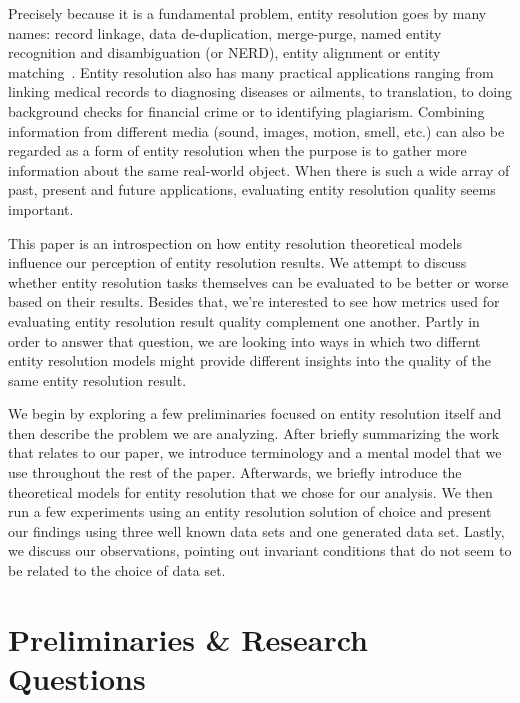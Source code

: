 \documentclass[journal]{IEEEtran}
\begin{document}
    Precisely because it is a fundamental problem, entity resolution goes by
    many names: record linkage, data de-duplication, merge-purge, named entity
    recognition and disambiguation (or NERD), entity alignment or entity
    matching~\cite{Tal11,fever2009,alhelbawy2014}.
    Entity resolution also has many practical applications ranging from linking
    medical records to diagnosing diseases or ailments, to translation, to doing
    background checks for financial crime or to identifying plagiarism.
    Combining information from different media (sound, images, motion, smell,
    etc.) can also be regarded as a form of entity resolution when the purpose
    is to gather more information about the same real-world object.
    When there is such a wide array of past, present and future applications,
    evaluating entity resolution quality seems important.

    This paper is an introspection on how entity resolution theoretical models
    influence our perception of entity resolution results.
    We attempt to discuss whether entity resolution tasks themselves can be
    evaluated to be better or worse based on their results.
    Besides that, we're interested to see how metrics used for evaluating entity
    resolution result quality complement one another.
    Partly in order to answer that question, we are looking into ways in which
    two differnt entity resolution models might provide different insights into
    the quality of the same entity resolution result.
    
    We begin by exploring a few preliminaries focused on entity resolution
    itself and then describe the problem we are analyzing.
    After briefly summarizing the work that relates to our paper, we introduce
    terminology and a mental model that we use throughout the rest of the paper.
    Afterwards, we briefly introduce the theoretical models for entity
    resolution that we chose for our analysis.
    We then run a few experiments using an entity resolution solution of choice
    and present our findings using three well known data sets and one generated
    data set.
    Lastly, we discuss our observations, pointing out invariant conditions that
    do not seem to be related to the choice of data set.

    \section[preliminaries-questions]{Preliminaries \& Research Questions}
    \label{sec:preliminaries-questions}
    
    
\end{document}
